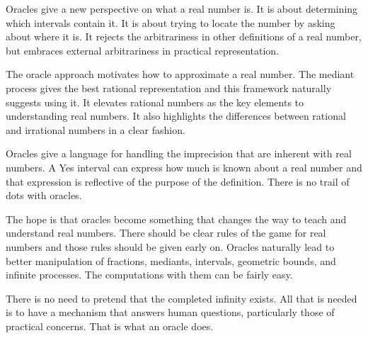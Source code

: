 \documentclass[12pt]{article}
\theoremstyle{remark}
\begin{document}
Oracles give a new perspective on what a real number is. It is about determining which intervals contain it. It is about trying to locate the number by asking about where it is. It rejects the arbitrariness in other definitions of a real number, but embraces external arbitrariness in practical representation.

The oracle approach motivates how to approximate a real number. The mediant process gives the best rational representation and this framework naturally suggests using it. It elevates rational numbers as the key elements to understanding real numbers. It also highlights the differences between rational and irrational numbers in a clear fashion. 

Oracles give a language for handling the imprecision that are inherent with real numbers. A Yes interval can express how much is known about a real number and that expression is reflective of the purpose of the definition. There is no  trail of dots with oracles. 

The hope is that oracles become something that changes the way to teach and understand real numbers. There should be clear rules of the game for real numbers and those rules should be given early on. Oracles naturally lead to better manipulation of fractions, mediants, intervals, geometric bounds, and infinite processes. The computations with them can be fairly easy. 

There is no need to pretend that the completed infinity exists. All that is needed is to have a mechanism that answers human questions, particularly those of practical concerns. That is what an oracle does. 

\medskip

\printbibliography
\end{document}
